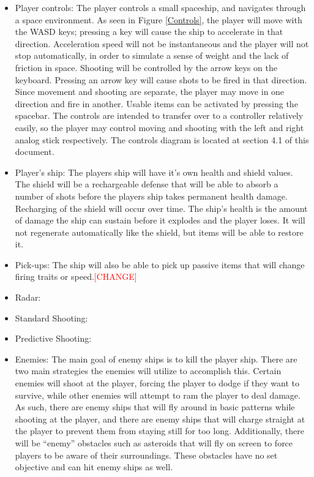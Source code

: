 \documentclass[12pt]{article}       %
\begin{document}
\begin{itemize}
\item Player controls: The player controls a small spaceship, and navigates through a space environment. As seen in Figure \ref{Controls}, the player will move with the WASD keys; pressing a key will cause the ship to accelerate in that direction. Acceleration speed will not be instantaneous and the player will not stop automatically, in order to simulate a sense of weight and the lack of friction in space. Shooting will be controlled by the arrow keys on the keyboard. Pressing an arrow key will cause shots to be fired in that direction. Since movement and shooting are separate, the player may move in one direction and fire in another. Usable items can be activated by pressing the spacebar. The controls are intended to transfer over to a controller relatively easily, so the player may control moving and shooting with the left and right analog stick respectively. The controls diagram is located at section 4.1 of this document.

\item Player’s ship: The players ship will have it’s own health and shield values. The shield will be a rechargeable defense that will be able to absorb a number of shots before the players ship takes permanent health damage. Recharging of the shield will occur over time. The ship’s health is the amount of damage the ship can sustain before it explodes and the player loses. It will not regenerate automatically like the shield, but items will be able to restore it.

\item Pick-ups:  The ship will also be able to pick up passive items that will change firing traits or speed.{\textcolor{Red}{[CHANGE]}}

\item Radar: 

\item Standard Shooting:

\item Predictive Shooting: 

\item Enemies: The main goal of enemy ships is to kill the player ship. There are two main strategies the enemies will utilize to accomplish this. Certain enemies will shoot at the player, forcing the player to dodge if they want to survive, while other enemies will attempt to ram the player to deal damage. As such, there are enemy ships that will fly around in basic patterns while shooting at the player, and there are enemy ships that will charge straight at the player to prevent them from staying still for too long. Additionally, there will be “enemy” obstacles such as asteroids that will fly on screen to force players to be aware of their surroundings. These obstacles have no set objective and can hit enemy ships as well.


\end{itemize}
\end{document}
